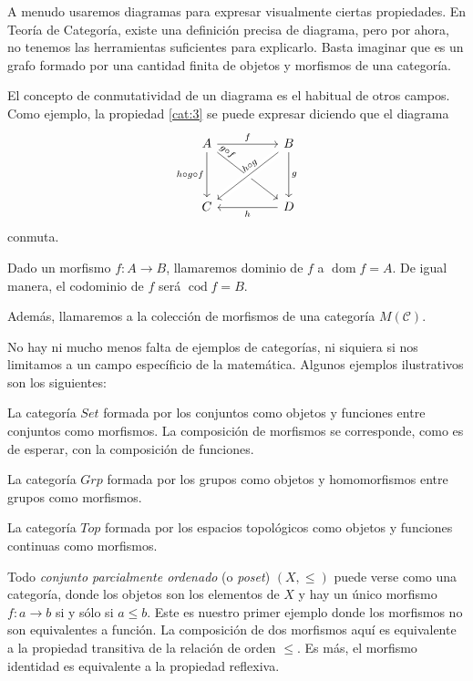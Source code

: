 \documentclass[12pt, twoside]{book}
\newcommand{\newterm}[1]{\index{#1}\emph{#1}}
\newcommand{\cat}{{\mathcal{C}}}
\newcommand{\Set}{{Set}}
\newcommand{\Grp}{{Grp}}
\newcommand{\Top}{{Top}}
\DeclareMathOperator{\dom}{dom}
\DeclareMathOperator{\cod}{cod}
\begin{document}
A menudo usaremos diagramas para expresar visualmente ciertas propiedades.
En Teoría de Categoría, existe una definición precisa de diagrama, pero por ahora, no tenemos las herramientas suficientes para explicarlo.
Basta imaginar que es un grafo formado por una cantidad finita de objetos y morfismos de una categoría.

El concepto de conmutatividad de un diagrama es el habitual de otros campos.
Como ejemplo, la propiedad \eqref{cat:3} se puede expresar diciendo que el diagrama
\[
\begin{tikzcd}
A \arrow[rr,"f"]\arrow[rrdd,pos=0.1,"g \circ f" sloped] \arrow[dd,"h\circ g \circ f" left] & & B \arrow[lldd,pos=0.4,"h\circ g" sloped, crossing over] \arrow[dd,"g"]\\
&\\
C & & D \arrow[ll,"h"]
\end{tikzcd}
\]
conmuta.

Dado un morfismo $f \colon A \to B$, llamaremos dominio de $f$ a $\dom f = A$.
De igual manera, el codominio de $f$ será $\cod f = B$.

Además, llamaremos a la colección de morfismos de una categoría $M(\cat)$.

No hay ni mucho menos falta de ejemplos de categorías, ni siquiera si nos limitamos a un campo específicio de la matemática.
Algunos ejemplos ilustrativos son los siguientes:

\begin{example}
La categoría $\Set$ formada por los conjuntos como objetos y funciones entre conjuntos como morfismos.
La composición de morfismos se corresponde, como es de esperar, con la composición de funciones.
\end{example}

\begin{example}
La categoría $\Grp$ formada por los grupos como objetos y homomorfismos entre grupos como morfismos.
\end{example}

\begin{example}
La categoría $\Top$ formada por los espacios topológicos como objetos y funciones continuas como morfismos.
\end{example}

\begin{example}
Todo \newterm{conjunto parcialmente ordenado} (o \emph{poset}) $(X,\leq)$ puede verse como una categoría, donde los objetos son los elementos de $X$ y hay un único morfismo $f \colon a \to b$ si y sólo si $a \leq b$.
Este es nuestro primer ejemplo donde los morfismos no son equivalentes a función.
La composición de dos morfismos aquí es equivalente a la propiedad transitiva de la relación de orden $\leq$.
Es más, el morfismo identidad es equivalente a la propiedad reflexiva.
\end{example}
\end{document}

